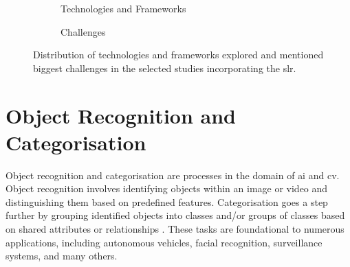 \begin{figure}[!htb]
    \begin{subfigure}{1\linewidth}
        \centering
        \caption{Technologies and Frameworks}
    \end{subfigure}

    \vspace{0.5cm}

    \begin{subfigure}{1\linewidth}
        \centering
        \caption{Challenges}
    \end{subfigure}
    \centering
    \caption{Distribution of technologies and frameworks explored and mentioned biggest challenges in the selected studies incorporating the \acl{slr}.}
    \label{fig:prisma_results}
\end{figure}

\section{Object Recognition and Categorisation} \label{subsec:object-recognition}

Object recognition and categorisation are processes in the domain of \ac{ai} and \ac{cv}. Object recognition involves identifying objects within an image or video and distinguishing them based on predefined features. Categorisation goes a step further by grouping identified objects into classes and/or groups of classes based on shared attributes or relationships \cite{Liu2021}. These tasks are foundational to numerous applications, including autonomous vehicles, facial recognition, surveillance systems, and many others.

